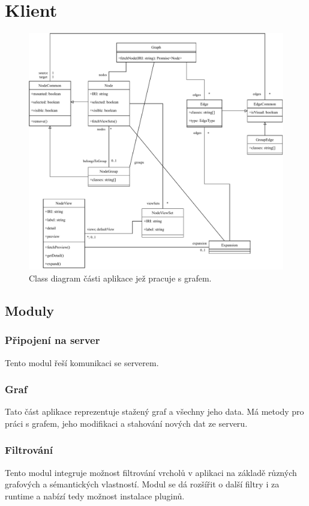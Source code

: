 \section{Klient}

\begin{figure}
    \centering
    \includegraphics[width=\textwidth]{media/graph.pdf}
    \caption{Class diagram části aplikace jež pracuje s grafem.}
\end{figure}

\subsection{Moduly}

\subsubsection{Připojení na server}
Tento modul řeší komunikaci se serverem.

\subsubsection{Graf}
Tato část aplikace reprezentuje stažený graf a všechny jeho data. Má metody pro práci s grafem, jeho modifikaci a stahování nových dat ze serveru.

\subsubsection{Filtrování}
Tento modul integruje možnost filtrování vrcholů v aplikaci na základě různých grafových a sémantických vlastností. Modul se dá rozšířit o další filtry i za runtime a nabízí tedy možnost instalace pluginů.

